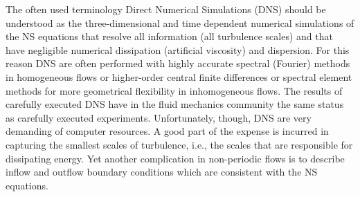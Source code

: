 

The often used terminology Direct Numerical Simulations (DNS) should be understood as the three-dimensional and time dependent numerical simulations of the NS equations that resolve all information (all turbulence scales) and that have negligible numerical dissipation (artificial viscosity) and dispersion. For this reason DNS are often performed with highly accurate spectral (Fourier) methods \cite{Canuto88} in homogeneous flows or higher-order central finite differences or spectral element methods \cite{semtex} for more geometrical flexibility in inhomogeneous flows. The results of carefully executed DNS have in the fluid mechanics community the same status as carefully executed experiments. Unfortunately, though, DNS are very demanding of computer resources. A good part of the expense is incurred in capturing the smallest scales of turbulence, i.e., the scales that are responsible for dissipating energy. Yet another complication in non-periodic flows is to describe inflow and outflow boundary conditions which are consistent with the NS equations.

